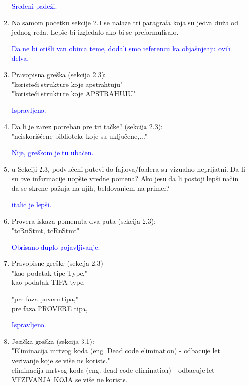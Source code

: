 \documentclass[a4paper]{report}
\newcommand{\odgovor}[1]{\textcolor{blue}{#1}}
\begin{document}
\begin{enumerate}
		\odgovor{Sređeni padeži.}
		
		
		\item Na samom početku sekcije 2.1 se nalaze tri paragrafa koja su jedva duža od jednog reda. Lepše bi izgledalo ako bi se preformulisalo.
		
		\odgovor{Da ne bi otišli van obima teme, dodali smo referencu ka objašnjenju ovih delva.}
		
		\item Pravopisna greška (sekcija 2.3):\\
		"koristeći strukture koje apstrahtuju"\\
		"koristeći strukture koje APSTRAHUJU"
		
		\odgovor{Ispravljeno.}
		
		\item Da li je zarez potreban pre tri tačke? (sekcija 2.3):\\
		"neiskorišćene biblioteke koje su uključene,..."
		
		\odgovor{Nije, greškom je tu ubačen.}
		
		\item u Sekciji 2.3, podvučeni putevi do fajlova/foldera su vizualno neprijatni. Da li su ove informacije uopšte vredne pomena? Ako jesu da li postoji lepši način da se skrene pažnja na njih, boldovanjem na primer?	
		
		\odgovor{italic je lepši.}
		
		\item Provera iskaza pomenuta dva puta (sekcija 2.3):\\
		"tcRnStmt, tcRnStmt"
		
		\odgovor{Obrisano duplo pojavljivanje.}
		
		\item Pravopisne greške (sekcija 2.3):\\
		"kao podatak tipe Type."\\
		kao podatak TIPA type.
		
		"pre faza povere tipa,"\\
		pre faza PROVERE tipa,
		
		\odgovor{Ispravljeno.}
		
		\item Jezička greška (sekcija 3.1):\\
		"Eliminacija mrtvog koda (eng. Dead code elimination) - odbacuje
		let vezivanje koje se više ne koriste."\\
		eliminacija mrtvog koda (eng. dead code elimination) - odbacuje
		let VEZIVANJA KOJA se više ne koriste.
		

\end{enumerate}
\end{document}
